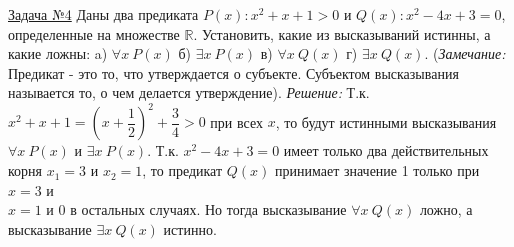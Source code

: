 \documentclass[a4paper,12pt]{article} %
\begin{document}
\label{Problem4}
\underline{Задача №4} Даны два предиката $P(x): x^2+x+1>0$ и $Q(x): x^2-4x+3=0$,
определенные на множестве $\mathbb R$. Установить, какие из высказываний истинны, 
а какие ложны: a) $\forall x\ P(x)$ б) $\exists x\ P(x)$ в) $\forall x\ Q(x)$ г) $\exists x\ Q(x)$.
(\textit{Замечание:} Предикат - это то, что утверждается о субъекте. Субъектом высказывания
называется то, о чем делается утверждение).\newline
\textit{Решение:}
Т.к. $x^2+x+1=\left (x+\dfrac12 \right)^2+\dfrac34 > 0$ при всех $x$, то будут
истинными высказывания $\forall x\ P(x)$ и $\exists x\ P(x)$. Т.к. $x^2-4x+3=0$ имеет 
только два действительных корня $x_1=3$ и $x_2=1$, то предикат $Q(x)$ принимает значение 1 только
при $x=3$ и \\$x=1$ и 0 в остальных случаях. Но тогда высказывание $\forall x\ Q(x)$ ложно, а
высказывание $\exists x\ Q(x)$ истинно.
\end{document}
